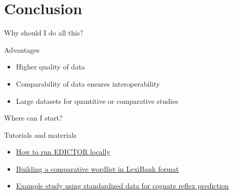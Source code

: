 \section{Conclusion}
\begin{frame}{Why should I do all this?}
    \begin{block}{Advantages}
        \begin{itemize}
            \item Higher quality of data
            \item Comparability of data ensures interoperability
            \item Large datasets for quantitive or comparative studies
        \end{itemize}
    \end{block}
\end{frame}


\begin{frame}{Where can I start?}
    \begin{block}{Tutorials and materials}
        \begin{itemize}
            \item \href{https://doi.org/10.15475/calcip.2025.1.1}{How to run EDICTOR locally \cite{Blum2025}} \pause
            \item \href{https://doi.org/10.1038/s41597-024-02928-7}{Building a comparative wordlist in LexiBank format} \pause 
            \item \href{https://doi.org/10.1038/s41598-024-82515-3}{Example study using standardized data for cognate reflex prediction \cite{Blum2024d}}
        \end{itemize}
    \end{block}
\end{frame}

